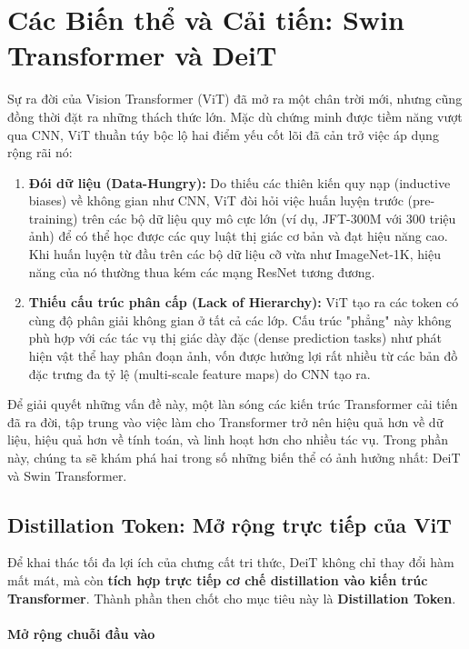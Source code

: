 \section{Các Biến thể và Cải tiến: Swin Transformer và DeiT}
\label{sec:vit_variants_and_improvements}

Sự ra đời của Vision Transformer (ViT) đã mở ra một chân trời mới, nhưng cũng đồng thời đặt ra những thách thức lớn. Mặc dù chứng minh được tiềm năng vượt qua CNN, ViT thuần túy bộc lộ hai điểm yếu cốt lõi đã cản trở việc áp dụng rộng rãi nó:
\begin{enumerate}
	\item \textbf{Đói dữ liệu (Data-Hungry):} Do thiếu các thiên kiến quy nạp (inductive biases) về không gian như CNN, ViT đòi hỏi việc huấn luyện trước (pre-training) trên các bộ dữ liệu quy mô cực lớn (ví dụ, JFT-300M với 300 triệu ảnh) để có thể học được các quy luật thị giác cơ bản và đạt hiệu năng cao. Khi huấn luyện từ đầu trên các bộ dữ liệu cỡ vừa như ImageNet-1K, hiệu năng của nó thường thua kém các mạng ResNet tương đương.
	\item \textbf{Thiếu cấu trúc phân cấp (Lack of Hierarchy):} ViT tạo ra các token có cùng độ phân giải không gian ở tất cả các lớp. Cấu trúc "phẳng" này không phù hợp với các tác vụ thị giác dày đặc (dense prediction tasks) như phát hiện vật thể hay phân đoạn ảnh, vốn được hưởng lợi rất nhiều từ các bản đồ đặc trưng đa tỷ lệ (multi-scale feature maps) do CNN tạo ra.
\end{enumerate}
Để giải quyết những vấn đề này, một làn sóng các kiến trúc Transformer cải tiến đã ra đời, tập trung vào việc làm cho Transformer trở nên hiệu quả hơn về dữ liệu, hiệu quả hơn về tính toán, và linh hoạt hơn cho nhiều tác vụ. Trong phần này, chúng ta sẽ khám phá hai trong số những biến thể có ảnh hưởng nhất: DeiT và Swin Transformer.

\subsection{Distillation Token: Mở rộng trực tiếp của ViT}
\label{subsubsec:deit_distillation_token}

Để khai thác tối đa lợi ích của chưng cất tri thức, DeiT không chỉ thay đổi hàm mất mát, mà còn \textbf{tích hợp trực tiếp cơ chế distillation vào kiến trúc Transformer}. Thành phần then chốt cho mục tiêu này là \textbf{Distillation Token}.

\paragraph{Mở rộng chuỗi đầu vào}


